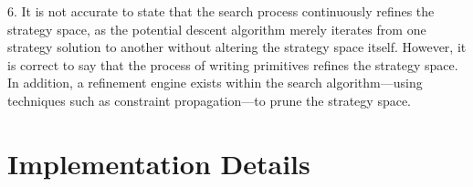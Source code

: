 \documentclass[letterpaper,twocolumn,10pt]{article}
\begin{document}
6. It is not accurate to state that the search process continuously refines the strategy space, as the potential descent algorithm merely iterates from one strategy solution to another without altering the strategy space itself. However, it is correct to say that the process of writing primitives refines the strategy space. In addition, a refinement engine exists within the search algorithm—using techniques such as constraint propagation—to prune the strategy space.

\section{Implementation Details}
\label{sec:implementation_details}

\end{document}
